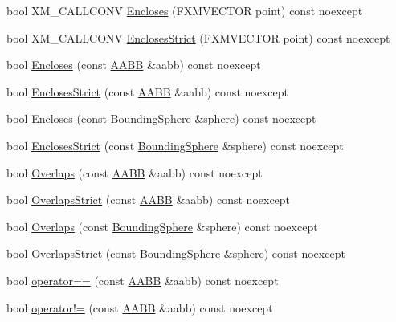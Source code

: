 \begin{DoxyCompactItemize}
bool X\+M\+\_\+\+C\+A\+L\+L\+C\+O\+NV \mbox{\hyperlink{classmage_1_1_a_a_b_b_a97e3f57fc91e4fea04572382c94f4279}{Encloses}} (F\+X\+M\+V\+E\+C\+T\+OR point) const noexcept
\item 
bool X\+M\+\_\+\+C\+A\+L\+L\+C\+O\+NV \mbox{\hyperlink{classmage_1_1_a_a_b_b_aa8946038ce497c79fa0ee34e87aa9aed}{Encloses\+Strict}} (F\+X\+M\+V\+E\+C\+T\+OR point) const noexcept
\item 
bool \mbox{\hyperlink{classmage_1_1_a_a_b_b_a06f017756a593461127613e4d77d0944}{Encloses}} (const \mbox{\hyperlink{classmage_1_1_a_a_b_b}{A\+A\+BB}} \&aabb) const noexcept
\item 
bool \mbox{\hyperlink{classmage_1_1_a_a_b_b_af037df0800e1e8c3564363f154c2424a}{Encloses\+Strict}} (const \mbox{\hyperlink{classmage_1_1_a_a_b_b}{A\+A\+BB}} \&aabb) const noexcept
\item 
bool \mbox{\hyperlink{classmage_1_1_a_a_b_b_ac8c2cadc06a6ad102c322504a43ca443}{Encloses}} (const \mbox{\hyperlink{classmage_1_1_bounding_sphere}{Bounding\+Sphere}} \&sphere) const noexcept
\item 
bool \mbox{\hyperlink{classmage_1_1_a_a_b_b_a463390d29cc113880fc259d1db8b1eda}{Encloses\+Strict}} (const \mbox{\hyperlink{classmage_1_1_bounding_sphere}{Bounding\+Sphere}} \&sphere) const noexcept
\item 
bool \mbox{\hyperlink{classmage_1_1_a_a_b_b_a0953268725119ef25651ab50ad3de658}{Overlaps}} (const \mbox{\hyperlink{classmage_1_1_a_a_b_b}{A\+A\+BB}} \&aabb) const noexcept
\item 
bool \mbox{\hyperlink{classmage_1_1_a_a_b_b_a00628d5ed2bf73021bbb3cdf94049580}{Overlaps\+Strict}} (const \mbox{\hyperlink{classmage_1_1_a_a_b_b}{A\+A\+BB}} \&aabb) const noexcept
\item 
bool \mbox{\hyperlink{classmage_1_1_a_a_b_b_acd344f81141b5439c3e2cf4321b6548b}{Overlaps}} (const \mbox{\hyperlink{classmage_1_1_bounding_sphere}{Bounding\+Sphere}} \&sphere) const noexcept
\item 
bool \mbox{\hyperlink{classmage_1_1_a_a_b_b_af5e8507258d4990abec9f6261449c6a9}{Overlaps\+Strict}} (const \mbox{\hyperlink{classmage_1_1_bounding_sphere}{Bounding\+Sphere}} \&sphere) const noexcept
\item 
bool \mbox{\hyperlink{classmage_1_1_a_a_b_b_a9297ff005f7bdcd934d744a6fb7ab5c9}{operator==}} (const \mbox{\hyperlink{classmage_1_1_a_a_b_b}{A\+A\+BB}} \&aabb) const noexcept
\item 
bool \mbox{\hyperlink{classmage_1_1_a_a_b_b_a1d23b60e46979cedc037fc59b3752572}{operator!=}} (const \mbox{\hyperlink{classmage_1_1_a_a_b_b}{A\+A\+BB}} \&aabb) const noexcept
\end{DoxyCompactItemize}
